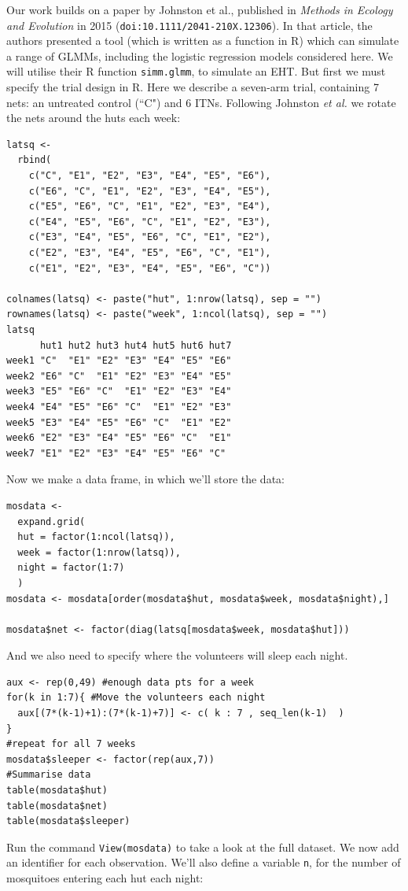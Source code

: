 \documentclass[11pt]{article}
\begin{document}
Our work builds on a paper by Johnston et al., published in \textit{Methods in Ecology and Evolution} in 2015 (\verb+doi:10.1111/2041-210X.12306+). In that article, the authors presented a tool (which is written as a function in R) which can simulate a range of GLMMs, including the logistic regression models considered here. We will utilise their R function \verb+simm.glmm+, to simulate an EHT. But first we must specify the trial design in R. Here we describe a seven-arm trial, containing 7 nets: an untreated control (``C") and 6 ITNs. Following Johnston \textit{et al.} we rotate the nets around the huts each week:
\begin{verbatim}
latsq <-
  rbind(
    c("C", "E1", "E2", "E3", "E4", "E5", "E6"),
    c("E6", "C", "E1", "E2", "E3", "E4", "E5"),
    c("E5", "E6", "C", "E1", "E2", "E3", "E4"),
    c("E4", "E5", "E6", "C", "E1", "E2", "E3"),
    c("E3", "E4", "E5", "E6", "C", "E1", "E2"),
    c("E2", "E3", "E4", "E5", "E6", "C", "E1"),
    c("E1", "E2", "E3", "E4", "E5", "E6", "C"))

colnames(latsq) <- paste("hut", 1:nrow(latsq), sep = "")
rownames(latsq) <- paste("week", 1:ncol(latsq), sep = "")
latsq
      hut1 hut2 hut3 hut4 hut5 hut6 hut7
week1 "C"  "E1" "E2" "E3" "E4" "E5" "E6"
week2 "E6" "C"  "E1" "E2" "E3" "E4" "E5"
week3 "E5" "E6" "C"  "E1" "E2" "E3" "E4"
week4 "E4" "E5" "E6" "C"  "E1" "E2" "E3"
week5 "E3" "E4" "E5" "E6" "C"  "E1" "E2"
week6 "E2" "E3" "E4" "E5" "E6" "C"  "E1"
week7 "E1" "E2" "E3" "E4" "E5" "E6" "C" 
\end{verbatim}
Now we make a data frame, in which we'll store the data:
\begin{verbatim}
mosdata <-
  expand.grid(
  hut = factor(1:ncol(latsq)),
  week = factor(1:nrow(latsq)),
  night = factor(1:7)
  )
mosdata <- mosdata[order(mosdata$hut, mosdata$week, mosdata$night),]

mosdata$net <- factor(diag(latsq[mosdata$week, mosdata$hut]))
\end{verbatim}
And we also need to specify where the volunteers will sleep each night.
\begin{verbatim}
aux <- rep(0,49) #enough data pts for a week
for(k in 1:7){ #Move the volunteers each night
  aux[(7*(k-1)+1):(7*(k-1)+7)] <- c( k : 7 , seq_len(k-1)  ) 
}
#repeat for all 7 weeks
mosdata$sleeper <- factor(rep(aux,7))
#Summarise data
table(mosdata$hut)
table(mosdata$net)
table(mosdata$sleeper)
\end{verbatim}
Run the command \verb+View(mosdata)+ to take a look at the full dataset. We now add an identifier for each observation. We'll also define a variable \verb+n+, for the number of mosquitoes entering each hut each night:
\end{document}
